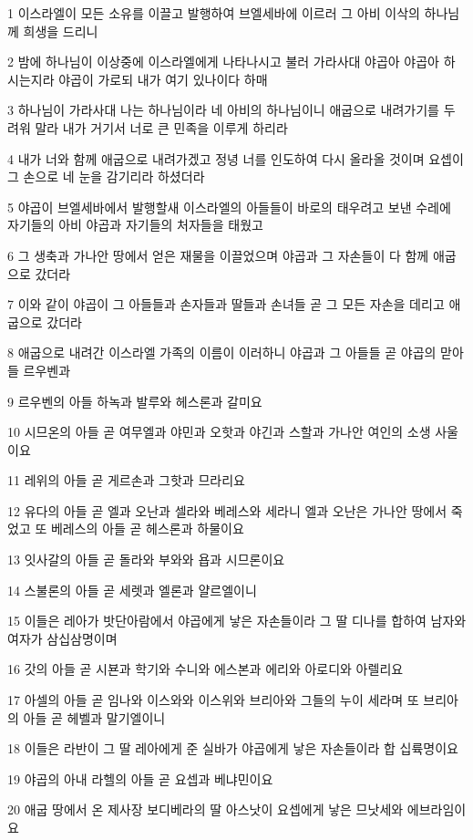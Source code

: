 \par 1 이스라엘이 모든 소유를 이끌고 발행하여 브엘세바에 이르러 그 아비 이삭의 하나님께 희생을 드리니
\par 2 밤에 하나님이 이상중에 이스라엘에게 나타나시고 불러 가라사대 야곱아 야곱아 하시는지라 야곱이 가로되 내가 여기 있나이다 하매
\par 3 하나님이 가라사대 나는 하나님이라 네 아비의 하나님이니 애굽으로 내려가기를 두려워 말라 내가 거기서 너로 큰 민족을 이루게 하리라
\par 4 내가 너와 함께 애굽으로 내려가겠고 정녕 너를 인도하여 다시 올라올 것이며 요셉이 그 손으로 네 눈을 감기리라 하셨더라
\par 5 야곱이 브엘세바에서 발행할새 이스라엘의 아들들이 바로의 태우려고 보낸 수레에 자기들의 아비 야곱과 자기들의 처자들을 태웠고
\par 6 그 생축과 가나안 땅에서 얻은 재물을 이끌었으며 야곱과 그 자손들이 다 함께 애굽으로 갔더라
\par 7 이와 같이 야곱이 그 아들들과 손자들과 딸들과 손녀들 곧 그 모든 자손을 데리고 애굽으로 갔더라
\par 8 애굽으로 내려간 이스라엘 가족의 이름이 이러하니 야곱과 그 아들들 곧 야곱의 맏아들 르우벤과
\par 9 르우벤의 아들 하녹과 발루와 헤스론과 갈미요
\par 10 시므온의 아들 곧 여무엘과 야민과 오핫과 야긴과 스할과 가나안 여인의 소생 사울이요
\par 11 레위의 아들 곧 게르손과 그핫과 므라리요
\par 12 유다의 아들 곧 엘과 오난과 셀라와 베레스와 세라니 엘과 오난은 가나안 땅에서 죽었고 또 베레스의 아들 곧 헤스론과 하물이요
\par 13 잇사갈의 아들 곧 돌라와 부와와 욥과 시므론이요
\par 14 스불론의 아들 곧 세렛과 엘론과 얄르엘이니
\par 15 이들은 레아가 밧단아람에서 야곱에게 낳은 자손들이라 그 딸 디나를 합하여 남자와 여자가 삼십삼명이며
\par 16 갓의 아들 곧 시뵨과 학기와 수니와 에스본과 에리와 아로디와 아렐리요
\par 17 아셀의 아들 곧 임나와 이스와와 이스위와 브리아와 그들의 누이 세라며 또 브리아의 아들 곧 헤벨과 말기엘이니
\par 18 이들은 라반이 그 딸 레아에게 준 실바가 야곱에게 낳은 자손들이라 합 십륙명이요
\par 19 야곱의 아내 라헬의 아들 곧 요셉과 베냐민이요
\par 20 애굽 땅에서 온 제사장 보디베라의 딸 아스낫이 요셉에게 낳은 므낫세와 에브라임이요
